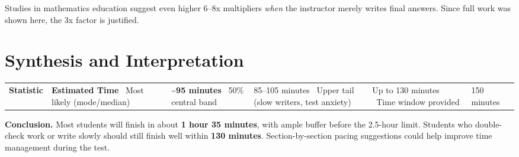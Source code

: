 \documentclass[12pt]{article}
\begin{document}
Studies in mathematics education suggest even higher 6--8x multipliers \emph{when} the instructor merely writes final answers. Since full work was shown here, the 3x factor is justified.

\section{Synthesis and Interpretation}
\begin{center}
\renewcommand{\arraystretch}{1.3}
\begin{tabular}{@{}ll@{}} \toprule \textbf{Statistic} & \textbf{Estimated Time} \ \midrule Most likely (mode/median) & \textbf{\textasciitilde95 minutes} \ 50\% central band & 85--105 minutes \ Upper tail (slow writers, test anxiety) & Up to 130 minutes \ Time window provided & 150 minutes \ \bottomrule \end{tabular} \end{center}

\textbf{Conclusion.} Most students will finish in about \textbf{1 hour 35 minutes}, with ample buffer before the 2.5-hour limit. Students who double-check work or write slowly should still finish well within \textbf{130 minutes}. Section-by-section pacing suggestions could help improve time management during the test.
\end{document}
